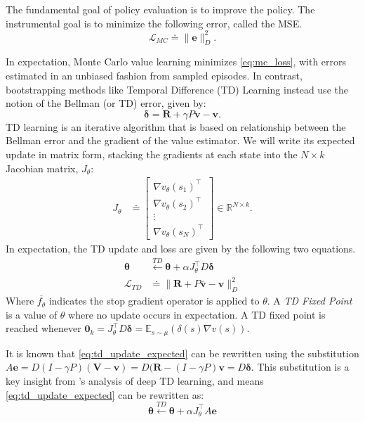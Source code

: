 \documentclass{article}
\theoremstyle{plain}
\theoremstyle{definition}
\theoremstyle{remark}
\begin{document}
The fundamental goal of policy evaluation is to improve the policy. The instrumental goal is to minimize the following error, called the MSE. 
\begin{equation}
  \mathcal{L}_{MC} \doteq \|\bm{e}\|_D^2. \label{eq:mc_loss}
\end{equation}

In expectation, Monte Carlo value learning minimizes \ref{eq:mc_loss}, with errors estimated in an unbiased fashion from sampled episodes. In contrast, bootstrapping methods like Temporal Difference (TD) Learning \cite{sutton_td} instead use the notion of the Bellman (or TD) error, given by:
\begin{equation}
  \bm{\delta} = \bm{R} + \gamma P \bm{v} - \bm{v}. \label{eq:td_error}
\end{equation}
TD learning is an iterative algorithm that is based on relationship between the Bellman error and the gradient of the value estimator. We will write its expected update in matrix form, stacking the gradients at each state into the $N \times k$ Jacobian matrix, $J_\theta$: 
\begin{align}
  J_\theta
  &\doteq
  \begin{bmatrix}
    \nabla v_\theta(s_1)^\top \\
    \nabla v_\theta(s_2)^\top \\
    \vdots \\
    \nabla v_\theta(s_N)^\top
  \end{bmatrix}
  \in \mathbb{R}^{N \times k}.
\end{align}
In expectation, the TD update and loss are given by the following two equations.
\begin{align}
\bm{\theta} &\xleftarrow{TD} \bm{\theta} + \alpha  J_\theta^\intercal D \bm{\delta} \label{eq:td_update_expected} \\
\mathcal{L}_{TD} &\doteq  \|\bm{R} + P\overline{ \bm{v} } - \bm{v}\|_D^2 
\end{align}
Where $\overline{f_\theta}$ indicates the stop gradient operator is applied to $\theta$. A \textit{TD Fixed Point} is a value of $\theta$ where no update occurs in expectation. A TD fixed point is reached whenever $\bm{0}_k = J_\theta^\intercal D \bm{\delta} =\mathbb{E}_{s \sim \mu} (\delta(s) \nabla v(s))$. 

It is known \cite{Tsitsiklis1997Analysis} that \eqref{eq:td_update_expected} can be rewritten using the substitution $A \bm{e} = D(I-\gamma P)(\bm{V}-\bm{v}) = D(\bm{R}-(I-\gamma P)\bm{v} = D \bm{\delta}$. This substitution is a key insight from \citep{tang2023towards}'s analysis of deep TD learning, and means \eqref{eq:td_update_expected} can be rewritten as:
\begin{equation}
  \bm{\theta} \xleftarrow{TD} \bm{\theta} + \alpha  J_\theta^\intercal A \bm{e}
  \label{eq:td_update_expected_A}
\end{equation}
\end{document}
